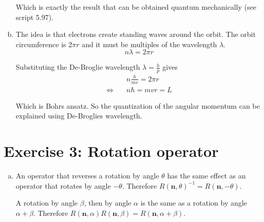 \documentclass[a4paper,german,12pt,smallheadings]{scrartcl}
\begin{document}
\begin{enumerate}[a)]
    Which is exactly the result that can be obtained quantum mechanically (see
    script 5.97).

  \item
    The idea is that electrons create standing waves around the orbit. The
    orbit circumference is $2 \pi r$ and it must be multiples of the wavelength
    $\lambda$.
    \begin{equation*}
      n \lambda = 2 \pi r
    \end{equation*}

    Substituting the De-Broglie wavelength $\lambda = \frac{h}{p}$ gives
    \begin{align*}
                           &n \frac{h}{mv} = 2 \pi r \\
      \Leftrightarrow\quad &n \hbar = mvr = L
    \end{align*}

    Which is Bohrs ansatz. So the quantization of the angular momentum can be
    explained using De-Broglies wavelength.

\end{enumerate}
\section*{Exercise 3: Rotation operator}
\begin{enumerate}[a)]
  \item
     An operator that reverses a rotation by angle $\theta$ has the same effect
     as an operator that rotates by angle $-\theta$. Therefore
     $R(\mathbf{n},\theta)^{-1} = R(\mathbf{n},-\theta)$.

     A rotation by angle $\beta$, then by angle $\alpha$ is the same as a
     rotation by angle $\alpha + \beta$. Therefore $R(\mathbf{n}, \alpha) R(\mathbf{n}, \beta) =
     R(\mathbf{n}, \alpha + \beta)$.
\end{enumerate}
\end{document}
